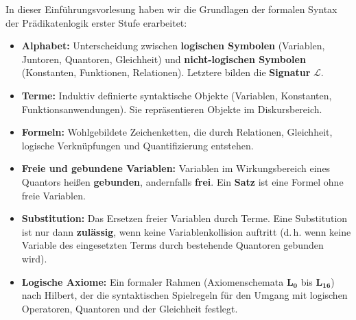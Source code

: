 \begin{nice-box}
In dieser Einführungsvorlesung haben wir die Grundlagen der formalen Syntax der Prädikatenlogik erster Stufe erarbeitet:
\begin{itemize}
    \item \textbf{Alphabet:} Unterscheidung zwischen \textbf{logischen Symbolen} (Variablen, Juntoren, Quantoren, Gleichheit) und \textbf{nicht-logischen Symbolen} (Konstanten, Funktionen, Relationen). Letztere bilden die \textbf{Signatur} $\mathcal{L}$.
    \item \textbf{Terme:} Induktiv definierte syntaktische Objekte (Variablen, Konstanten, Funktionsanwendungen). Sie repräsentieren Objekte im Diskursbereich.
    \item \textbf{Formeln:} Wohlgebildete Zeichenketten, die durch Relationen, Gleichheit, logische Verknüpfungen und Quantifizierung entstehen.
    \item \textbf{Freie und gebundene Variablen:} Variablen im Wirkungsbereich eines Quantors heißen \textbf{gebunden}, andernfalls \textbf{frei}. Ein \textbf{Satz} ist eine Formel ohne freie Variablen.
    \item \textbf{Substitution:} Das Ersetzen freier Variablen durch Terme. Eine Substitution ist nur dann \textbf{zulässig}, wenn keine Variablenkollision auftritt (d.\,h. wenn keine Variable des eingesetzten Terms durch bestehende Quantoren gebunden wird).
    \item \textbf{Logische Axiome:} Ein formaler Rahmen (Axiomenschemata $\mathbf{L_0}$ bis $\mathbf{L_{16}}$) nach Hilbert, der die syntaktischen Spielregeln für den Umgang mit logischen Operatoren, Quantoren und der Gleichheit festlegt.
\end{itemize}
\end{nice-box}